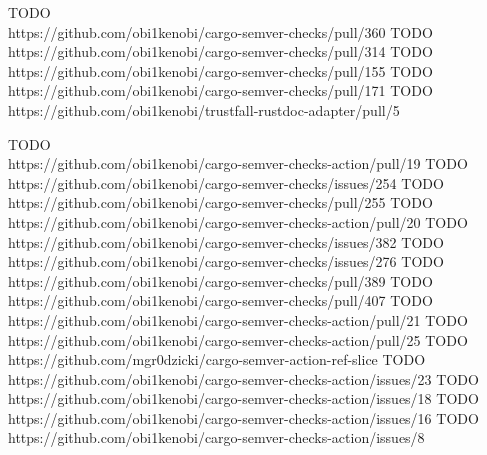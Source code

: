 \documentclass[licencjacka,en]{pracamgr}
\begin{document}
\begin{thebibliography}{99}
 TODO \\ https://github.com/obi1kenobi/cargo-semver-checks/pull/360
 TODO \\ https://github.com/obi1kenobi/cargo-semver-checks/pull/314
 TODO \\ https://github.com/obi1kenobi/cargo-semver-checks/pull/155
 TODO \\ https://github.com/obi1kenobi/cargo-semver-checks/pull/171
 TODO \\ https://github.com/obi1kenobi/trustfall-rustdoc-adapter/pull/5

 TODO \\ https://github.com/obi1kenobi/cargo-semver-checks-action/pull/19
 TODO \\ https://github.com/obi1kenobi/cargo-semver-checks/issues/254
 TODO \\ https://github.com/obi1kenobi/cargo-semver-checks/pull/255
 TODO \\ https://github.com/obi1kenobi/cargo-semver-checks-action/pull/20
 TODO \\ https://github.com/obi1kenobi/cargo-semver-checks/issues/382
 TODO \\ https://github.com/obi1kenobi/cargo-semver-checks/issues/276
 TODO \\ https://github.com/obi1kenobi/cargo-semver-checks/pull/389
 TODO \\ https://github.com/obi1kenobi/cargo-semver-checks/pull/407
 TODO \\ https://github.com/obi1kenobi/cargo-semver-checks-action/pull/21
 TODO \\ https://github.com/obi1kenobi/cargo-semver-checks-action/pull/25
 TODO \\
https://github.com/mgr0dzicki/cargo-semver-action-ref-slice
 TODO \\ https://github.com/obi1kenobi/cargo-semver-checks-action/issues/23
 TODO \\
https://github.com/obi1kenobi/cargo-semver-checks-action/issues/18
 TODO \\
https://github.com/obi1kenobi/cargo-semver-checks-action/issues/16
 TODO \\
https://github.com/obi1kenobi/cargo-semver-checks-action/issues/8


\end{thebibliography}
\end{document}
